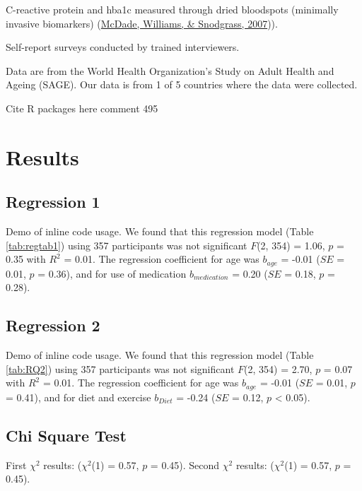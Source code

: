 \documentclass[
  man]{apa6}
\begin{document}
C-reactive protein and hba1c measured through dried bloodspots (minimally invasive biomarkers) (\protect\hyperlink{ref-10.1353ux2fdem.2007.0038}{McDade, Williams, \& Snodgrass, 2007})).

Self-report surveys conducted by trained interviewers.

Data are from the World Health Organization's Study on Adult Health and Ageing (SAGE). Our data is from 1 of 5 countries where the data were collected.

Cite R packages here
comment 495

\hypertarget{results}{%
\section{Results}\label{results}}

\hypertarget{regression-1}{%
\subsection{Regression 1}\label{regression-1}}

Demo of inline code usage. We found that this regression model (Table \ref{tab:regtab1}) using 357 participants was not significant \(F\)(2, 354) = 1.06, \(p\) = 0.35 with \(R^2\) = 0.01. The regression coefficient for age was \(b_{age}\) = -0.01 (\(SE\) = 0.01, \(p\) = 0.36), and for use of medication \(b_{medication}\) = 0.20 (\(SE\) = 0.18, \(p\) = 0.28).

\hypertarget{regression-2}{%
\subsection{Regression 2}\label{regression-2}}

Demo of inline code usage. We found that this regression model (Table \ref{tab:RQ2}) using 357 participants was not significant \(F\)(2, 354) = 2.70, \(p\) = 0.07 with \(R^2\) = 0.01. The regression coefficient for age was \(b_{age}\) = -0.01 (\(SE\) = 0.01, \(p\) = 0.41), and for diet and exercise \(b_{Diet}\) = -0.24 (\(SE\) = 0.12, \(p\) \textless{} 0.05).

\hypertarget{chi-square-test}{%
\subsection{Chi Square Test}\label{chi-square-test}}

First \(\chi^2\) results: (\(\chi^2\)(1) = 0.57, \(p\) = 0.45).
Second \(\chi^2\) results: (\(\chi^2\)(1) = 0.57, \(p\) = 0.45).
\end{document}
